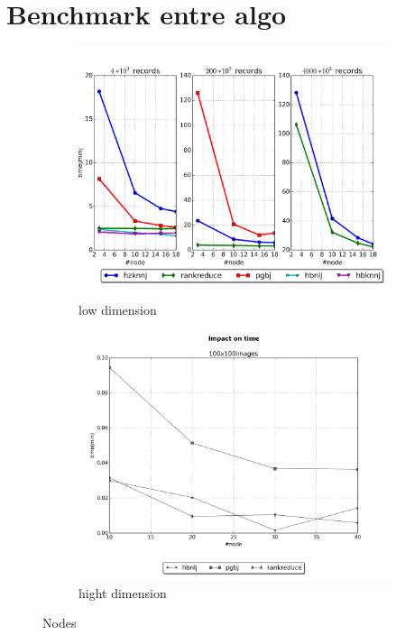 \documentclass[10pt,a4paper]{article}
\begin{document}
\section{Benchmark entre algo}

 \begin{figure}[ht]
 \centering
 	  \begin{subfigure}[b]{0.4\textwidth}
                 \includegraphics[width=\textwidth]{../graph/geo/nodes.png} 
                \caption{low dimension}
        \end{subfigure}%
        \begin{subfigure}[b]{0.4\textwidth}
                 \includegraphics[width=\textwidth]{../graph/surf/nodes.png} 
                \caption{hight dimension}
        \end{subfigure}%
        \caption{Nodes}
  \end{figure}
  
\end{document}
